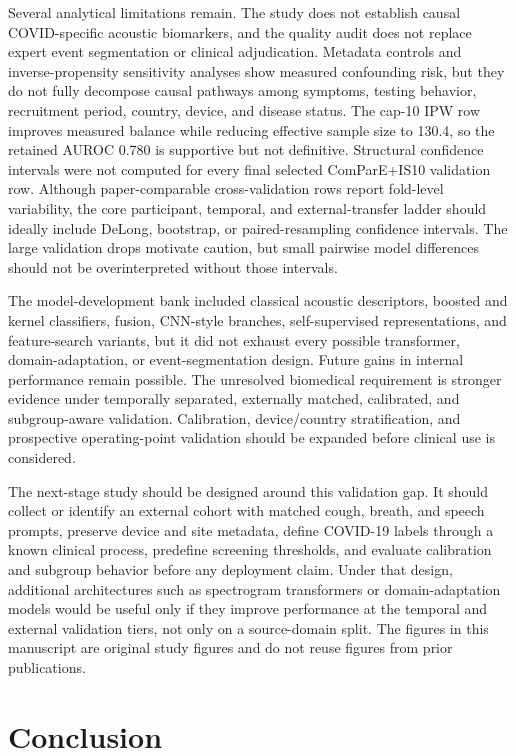 \documentclass[preprint,12pt]{elsarticle}
\begin{document}
Several analytical limitations remain. The study does not establish causal COVID-specific acoustic biomarkers, and the quality audit does not replace expert event segmentation or clinical adjudication. Metadata controls and inverse-propensity sensitivity analyses show measured confounding risk, but they do not fully decompose causal pathways among symptoms, testing behavior, recruitment period, country, device, and disease status. The cap-10 IPW row improves measured balance while reducing effective sample size to 130.4, so the retained AUROC 0.780 is supportive but not definitive. Structural confidence intervals were not computed for every final selected ComParE+IS10 validation row. Although paper-comparable cross-validation rows report fold-level variability, the core participant, temporal, and external-transfer ladder should ideally include DeLong, bootstrap, or paired-resampling confidence intervals. The large validation drops motivate caution, but small pairwise model differences should not be overinterpreted without those intervals.

The model-development bank included classical acoustic descriptors, boosted and kernel classifiers, fusion, CNN-style branches, self-supervised representations, and feature-search variants, but it did not exhaust every possible transformer, domain-adaptation, or event-segmentation design. Future gains in internal performance remain possible. The unresolved biomedical requirement is stronger evidence under temporally separated, externally matched, calibrated, and subgroup-aware validation. Calibration, device/country stratification, and prospective operating-point validation should be expanded before clinical use is considered.

The next-stage study should be designed around this validation gap. It should collect or identify an external cohort with matched cough, breath, and speech prompts, preserve device and site metadata, define COVID-19 labels through a known clinical process, predefine screening thresholds, and evaluate calibration and subgroup behavior before any deployment claim. Under that design, additional architectures such as spectrogram transformers or domain-adaptation models would be useful only if they improve performance at the temporal and external validation tiers, not only on a source-domain split. The figures in this manuscript are original study figures and do not reuse figures from prior publications.

\section{Conclusion}
\end{document}
